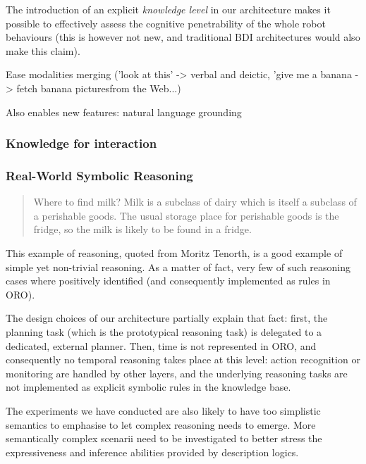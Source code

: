 The introduction of an explicit \emph{knowledge level} in our architecture
makes it possible to effectively assess the cognitive penetrability of the
whole robot behaviours (this is however not new, and traditional BDI
architectures would also make this claim).

Ease modalities merging ('look at this' -> verbal and deictic, 'give me a
banana -> fetch banana picturesfrom the Web...)

Also enables new features: natural language grounding


\subsubsection{Knowledge for interaction}

\subsubsection{Real-World Symbolic Reasoning}

\begin{quote}

    Where to find milk? Milk is a subclass of dairy which is itself a subclass
    of a perishable goods. The usual storage place for perishable goods is the
    fridge, so the milk is likely to be found in a fridge.

\end{quote}

This example of reasoning, quoted from Moritz Tenorth, is a good example of
simple yet non-trivial reasoning. As a matter of fact, very few of such
reasoning cases where positively identified (and consequently implemented as
rules in ORO).

The design choices of our architecture partially explain that fact: first, the
planning task (which is the prototypical reasoning task) is delegated to a
dedicated, external planner. Then, time is not represented in ORO, and
consequently no temporal reasoning takes place at this level: action
recognition or monitoring are handled by other layers, and the underlying
reasoning tasks are not implemented as explicit symbolic rules in the knowledge
base.

The experiments we have conducted are also likely to have too simplistic
semantics to emphasise to let complex reasoning needs to emerge. More
semantically complex scenarii need to be investigated to better stress the
expressiveness and inference abilities provided by description logics.

